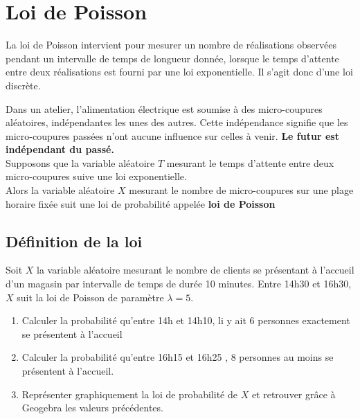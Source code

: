 \documentclass[a4paper,12pt,openany]{book}
\begin{document}
 \bigskip
 \newpage
 
 \section{Loi de Poisson}
 
 La loi de Poisson intervient pour mesurer un nombre de réalisations observées pendant un intervalle de temps de longueur donnée, lorsque le temps d'attente entre deux réalisations est fourni par une loi exponentielle. Il s'agit donc d'une loi discrète.
 

\bigskip

\exemple Dans un atelier, l'alimentation électrique est soumise à des micro-coupures aléatoires, indépendantes les unes des autres. Cette indépendance signifie que les micro-coupures passées n'ont aucune influence sur celles à venir. \textbf{Le futur est indépendant du passé.}\\

Supposons que la variable aléatoire $T$ mesurant le temps d'attente entre deux micro-coupures suive une loi exponentielle.\\

Alors la variable aléatoire $X$ mesurant le nombre de micro-coupures sur une plage horaire fixée suit une loi de probabilité appelée \textbf{loi de Poisson}

\subsection{Définition de la loi}


\bigskip

\exer Soit $X$ la variable aléatoire mesurant le nombre de clients se présentant à l'accueil d'un magasin par intervalle de temps de durée 10 minutes. Entre 14h30 et 16h30, $X$ suit la loi de Poisson de paramètre $\lambda = 5$.

\begin{enumerate}
	\item Calculer la probabilité qu'entre 14h et 14h10, li y ait 6 personnes exactement se présentent à l'accueil
	
	\vspace{0.7cm}
	
	\item Calculer la probabilité qu'entre 16h15 et 16h25 , 8 personnes au moins se présentent à l'accueil.
	
		\vspace{0.7cm}

	\item Représenter graphiquement la loi de probabilité de $X$ et retrouver grâce à Geogebra les valeurs précédentes. 
\end{enumerate}
\end{document}
